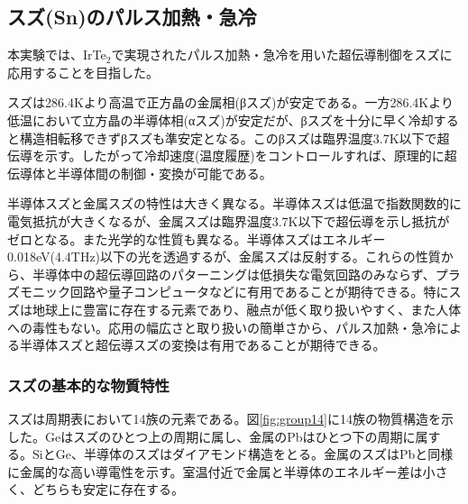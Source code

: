 \subsection{スズ(Sn)のパルス加熱・急冷}
本実験では、IrTe$_2$で実現されたパルス加熱・急冷を用いた超伝導制御をスズに応用することを目指した。

スズは286.4Kより高温で正方晶の金属相(βスズ)が安定である。一方286.4Kより低温において立方晶の半導体相(αスズ)が安定だが、βスズを十分に早く冷却すると構造相転移できずβスズも準安定となる。このβスズは臨界温度3.7K以下で超伝導を示す。したがって冷却速度(温度履歴)をコントロールすれば、原理的に超伝導体と半導体間の制御・変換が可能である。

半導体スズと金属スズの特性は大きく異なる。半導体スズは低温で指数関数的に電気抵抗が大きくなるが、金属スズは臨界温度3.7K以下で超伝導を示し抵抗がゼロとなる。また光学的な性質も異なる。半導体スズはエネルギー0.018eV(4.4THz)以下の光を透過するが、金属スズは反射する。これらの性質から、半導体中の超伝導回路のパターニングは低損失な電気回路のみならず、プラズモニック回路や量子コンピュータなどに有用であることが期待できる。特にスズは地球上に豊富に存在する元素であり、融点が低く取り扱いやすく、また人体への毒性もない。応用の幅広さと取り扱いの簡単さから、パルス加熱・急冷による半導体スズと超伝導スズの変換は有用であることが期待できる。

\subsubsection{スズの基本的な物質特性}
スズは周期表において14族の元素である。図\ref{fig:group14}に14族の物質構造を示した。Geはスズのひとつ上の周期に属し、金属のPbはひとつ下の周期に属する。SiとGe、半導体のスズはダイアモンド構造をとる。金属のスズはPbと同様に金属的な高い導電性を示す。室温付近で金属と半導体のエネルギー差は小さく、どちらも安定に存在する。

